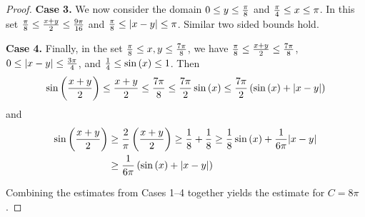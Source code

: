 \documentclass[10pt,a4paper]{amsart}
\begin{document}
\begin{proof}
\textbf{Case 3.} We now consider the domain $0 \leq y \leq {\pi \over 8}$ and ${\pi \over 4} \leq x \leq \pi$.  In this set 
${\pi \over 8} \leq {x+y\over 2} \leq {9 \pi \over 16}$ and ${\pi \over 8} \leq |x -y| \leq \pi$. Similar two sided bounds hold.
  
\textbf{Case 4.} Finally, in the set ${\pi \over 8} \leq x, y \leq {7 \pi \over 8}$, we have ${\pi \over 8} \leq {x+ y\over 2} \leq {7 \pi \over 8}$, $0 \leq |x-y| \leq {3 \pi \over 4}$, and ${1\over 4} \leq \sin\left( {x}\right) \leq 1$.  Then
\begin{align*}
\sin\left( {x + y\over 2} \right) \leq {x + y\over 2} \leq {7\pi \over 8} \leq {7\pi \over 2} \sin\left( {x}\right) \leq {7\pi \over 2} \left(\sin\left( {x}\right) + |x - y| \right) 
\end{align*}
and
\begin{align*}
\sin\left( {x + y\over 2} \right) & \geq {2 \over \pi} \left( {x + y\over 2} \right) \geq  
{1\over 8} + {1\over 8} \geq 
{1\over 8} \sin\left( {x}\right) 
+ {1 \over 6\pi} |x-y| \\
& 
\geq {1\over 6\pi}\left(\sin\left( {x }\right) + |x - y| \right) 
\end{align*}

Combining the estimates from Cases 1--4 together yields the estimate for $C = 8\pi$.

\end{proof}
\end{document}
